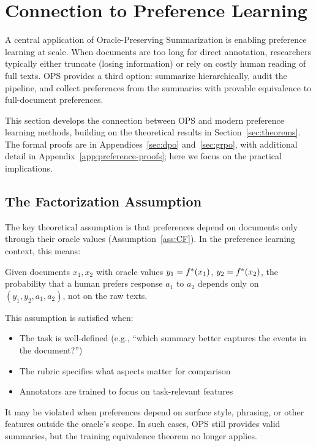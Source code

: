 \section{Connection to Preference Learning}\label{sec:preference}

A central application of Oracle-Preserving Summarization is enabling preference learning at scale. When documents are too long for direct annotation, researchers typically either truncate (losing information) or rely on costly human reading of full texts. OPS provides a third option: summarize hierarchically, audit the pipeline, and collect preferences from the summaries with provable equivalence to full-document preferences.

This section develops the connection between OPS and modern preference learning methods, building on the theoretical results in Section~\ref{sec:theorems}. The formal proofs are in Appendices~\ref{sec:dpo} and~\ref{sec:grpo}, with additional detail in Appendix~\ref{app:preference-proofs}; here we focus on the practical implications.

\subsection{The Factorization Assumption}

The key theoretical assumption is that preferences depend on documents only through their oracle values (Assumption~\ref{ass:CF}). In the preference learning context, this means:

\begin{assumption}\label{ass:pref}
Given documents $x_1, x_2$ with oracle values $y_1 = f^{\ast}(x_1)$, $y_2 = f^{\ast}(x_2)$, the probability that a human prefers response $a_1$ to $a_2$ depends only on $(y_1, y_2, a_1, a_2)$, not on the raw texts.
\end{assumption}

This assumption is satisfied when:
\begin{itemize}[nosep]
    \item The task is well-defined (e.g., ``which summary better captures the events in the document?'')
    \item The rubric specifies what aspects matter for comparison
    \item Annotators are trained to focus on task-relevant features
\end{itemize}

It may be violated when preferences depend on surface style, phrasing, or other features outside the oracle's scope. In such cases, OPS still provides valid summaries, but the training equivalence theorem no longer applies.

